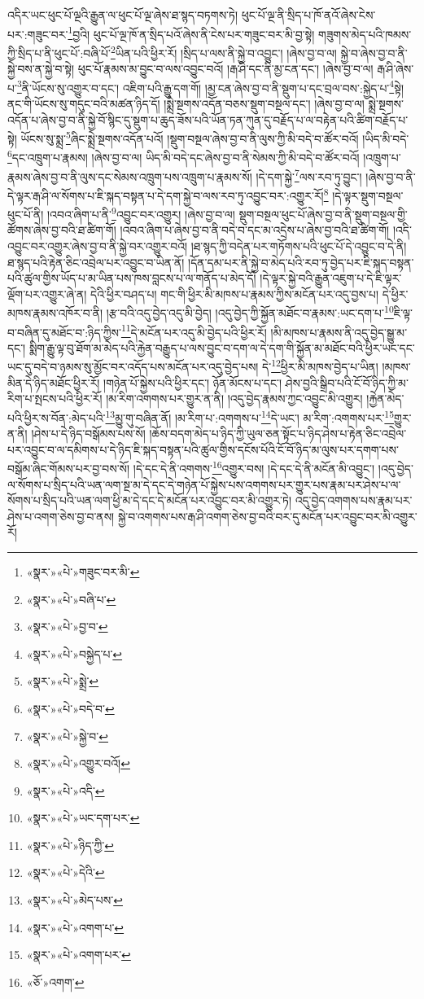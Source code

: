 འདིར་ཡང་ཕུང་པོ་ལྔའི་རྒྱུན་ལ་ཕུང་པོ་ལྔ་ཞེས་ཐ་སྙད་བཏགས་ཏེ། ཕུང་པོ་ལྔ་ནི་སྲིད་པ་ཁོ་ནའོ་ཞེས་ངེས་པར་:གཟུང་བར་\footnote{«སྣར་»«པེ་»གཟུང་བར་མི་}བྱའི། ཕུང་པོ་ལྔ་ཁོ་ན་སྲིད་པའོ་ཞེས་ནི་ངེས་པར་གཟུང་བར་མི་བྱ་སྟེ། གཟུགས་མེད་པའི་ཁམས་ཀྱི་སྲིད་པ་ནི་ཕུང་པོ་:བཞི་པོ་\footnote{«སྣར་»«པེ་»བཞི་པ་}ཡིན་པའི་ཕྱིར་རོ། །སྲིད་པ་ལས་ནི་སྐྱེ་བ་འབྱུང་། །ཞེས་བྱ་བ་ལ། སྐྱེ་བ་ཞེས་བྱ་བ་ནི་སྐྱེ་བས་ན་སྐྱེ་བ་སྟེ། ཕུང་པོ་རྣམས་མ་བྱུང་བ་ལས་འབྱུང་བའོ། །རྒ་ཤི་དང་ནི་མྱ་ངན་དང་། །ཞེས་བྱ་བ་ལ། རྒ་ཤི་ཞེས་པ་\footnote{«སྣར་»«པེ་»བྱ་བ་}ནི་ཡོངས་སུ་འགྱུར་བ་དང་། འཇིག་པའི་རྒྱུ་དག་གོ། །མྱ་ངན་ཞེས་བྱ་བ་ནི་སྡུག་པ་དང་བྲལ་བས་:སྐྱེད་པ་\footnote{«སྣར་»«པེ་»བསྐྱེད་པ་}སྟེ། ནང་གི་ཡོངས་སུ་གདུང་བའི་མཚན་ཉིད་དོ། །སྨྲེ་སྔགས་འདོན་བཅས་སྡུག་བསྔལ་དང་། །ཞེས་བྱ་བ་ལ། སྨྲེ་སྔགས་འདོན་པ་ཞེས་བྱ་བ་ནི་སྐྱེ་བོ་སྙིང་དུ་སྡུག་པ་ཆུད་ཟོས་པའི་ཡོན་ཏན་ཀུན་དུ་བརྗོད་པ་ལ་བརྟེན་པའི་ཚིག་བརྗོད་པ་སྟེ། ཡོངས་སུ་སྨྲ་\footnote{«སྣར་»«པེ་»སྨྲེ་}ཞིང་སྨྲེ་སྔགས་འདོན་པའོ། །སྡུག་བསྔལ་ཞེས་བྱ་བ་ནི་ལུས་ཀྱི་མི་བདེ་བ་ཚོར་བའོ། །ཡིད་མི་བདེ་\footnote{«སྣར་»«པེ་»བདེ་བ་}དང་འཁྲུག་པ་རྣམས། །ཞེས་བྱ་བ་ལ། ཡིད་མི་བདེ་དང་ཞེས་བྱ་བ་ནི་སེམས་ཀྱི་མི་བདེ་བ་ཚོར་བའོ། །འཁྲུག་པ་རྣམས་ཞེས་བྱ་བ་ནི་ལུས་དང་སེམས་འཁྲུག་པས་འཁྲུག་པ་རྣམས་སོ། །དེ་དག་སྐྱེ་\footnote{«སྣར་»«པེ་»སྐྱེ་བ་}ལས་རབ་ཏུ་བྱུང་། །ཞེས་བྱ་བ་ནི་དེ་ལྟར་རྒ་ཤི་ལ་སོགས་པ་ཇི་སྐད་བསྟན་པ་དེ་དག་སྐྱེ་བ་ལས་རབ་ཏུ་འབྱུང་བར་:འགྱུར་རོ།\footnote{«སྣར་»«པེ་»འགྱུར་བའོ།} །དེ་ལྟར་སྡུག་བསྔལ་ཕུང་པོ་ནི། །འབའ་ཞིག་པ་ནི་\footnote{«སྣར་»«པེ་»འདི་}འབྱུང་བར་འགྱུར། །ཞེས་བྱ་བ་ལ། སྡུག་བསྔལ་ཕུང་པོ་ཞེས་བྱ་བ་ནི་སྡུག་བསྔལ་གྱི་ཚོགས་ཞེས་བྱ་བའི་ཐ་ཚིག་གོ། །འབའ་ཞིག་པ་ཞེས་བྱ་བ་ནི་བདེ་བ་དང་མ་འདྲེས་པ་ཞེས་བྱ་བའི་ཐ་ཚིག་གོ། །འདི་འབྱུང་བར་འགྱུར་ཞེས་བྱ་བ་ནི་སྐྱེ་བར་འགྱུར་བའོ། །ཐ་སྙད་ཀྱི་བདེན་པར་གཏོགས་པའི་ཕུང་པོ་དེ་འབྱུང་བ་དེ་ནི། ཐ་སྙད་པའི་རྟེན་ཅིང་འབྲེལ་པར་འབྱུང་བ་ཡིན་ནོ། །དོན་དམ་པར་ནི་སྐྱེ་བ་མེད་པའི་རབ་ཏུ་བྱེད་པར་ཇི་སྐད་བསྟན་པའི་ཚུལ་གྱིས་ཡོད་པ་མ་ཡིན་པས་ཁས་བླངས་པ་ལ་གནོད་པ་མེད་དོ། །དེ་ལྟར་སྐྱེ་བའི་རྒྱུན་འཇུག་པ་དེ་ཇི་ལྟར་ལྡོག་པར་འགྱུར་ཞེ་ན། དེའི་ཕྱིར་བཤད་པ། གང་གི་ཕྱིར་མི་མཁས་པ་རྣམས་ཀྱིས་མངོན་པར་འདུ་བྱས་པ། དེ་ཕྱིར་མཁས་རྣམས་འཁོར་བ་ནི། །རྩ་བའི་འདུ་བྱེད་འདུ་མི་བྱེད། །འདུ་བྱེད་ཀྱི་སྐྱོན་མཐོང་བ་རྣམས་:ཡང་དག་པ་\footnote{«སྣར་»«པེ་»ཡང་དག་པར་}ཇི་ལྟ་བ་བཞིན་དུ་མཐོང་བ་:ཉིད་ཀྱིས་\footnote{«སྣར་»«པེ་»ཉིད་ཀྱི་}དེ་མངོན་པར་འདུ་མི་བྱེད་པའི་ཕྱིར་རོ། །མི་མཁས་པ་རྣམས་ནི་འདུ་བྱེད་སྒྱུ་མ་དང་། སྨིག་རྒྱུ་ལྟ་བུ་ཐོག་མ་མེད་པའི་རྐྱེན་བརྒྱུད་པ་ལས་བྱུང་བ་དག་ལ་དེ་དག་གི་སྐྱོན་མ་མཐོང་བའི་ཕྱིར་ཡང་དང་ཡང་དུ་བདེ་བ་ཉམས་སུ་མྱོང་བར་འདོད་པས་མངོན་པར་འདུ་བྱེད་པས། དེ་\footnote{«སྣར་»«པེ་»དེའི་}ཕྱིར་མི་མཁས་བྱེད་པ་ཡིན། །མཁས་མིན་དེ་ཉིད་མཐོང་ཕྱིར་རོ། །གཉེན་པོ་སྐྱེས་པའི་ཕྱིར་དང་། ཉོན་མོངས་པ་དང་། ཤེས་བྱའི་སྒྲིབ་པའི་ངོ་བོ་ཉིད་ཀྱི་མ་རིག་པ་སྤངས་པའི་ཕྱིར་རོ། །མ་རིག་འགགས་པར་གྱུར་ན་ནི། །འདུ་བྱེད་རྣམས་ཀྱང་འབྱུང་མི་འགྱུར། །རྐྱེན་མེད་པའི་ཕྱིར་ས་བོན་:མེད་པའི་\footnote{«སྣར་»«པེ་»མེད་པས་}མྱུ་གུ་བཞིན་ནོ། །མ་རིག་པ་:འགགས་པ་\footnote{«སྣར་»«པེ་»འགག་པ་}དེ་ཡང་། མ་རིག་:འགགས་པར་\footnote{«སྣར་»«པེ་»འགག་པར་}གྱུར་ན་ནི། །ཤེས་པ་དེ་ཉིད་བསྒོམས་པས་སོ། །ཆོས་བདག་མེད་པ་ཉིད་ཀྱི་ཡུལ་ཅན་སྟོང་པ་ཉིད་ཤེས་པ་རྟེན་ཅིང་འབྲེལ་པར་འབྱུང་བ་ལ་དམིགས་པ་དེ་ཉིད་ཇི་སྐད་བསྟན་པའི་ཚུལ་གྱིས་དངོས་པོའི་ངོ་བོ་ཉིད་མ་ལུས་པར་དགག་པས་བསྒོམ་ཞིང་གོམས་པར་བྱ་བས་སོ། །དེ་དང་དེ་ནི་འགགས་\footnote{«ཅོ་»འགག་}འགྱུར་བས། །དེ་དང་དེ་ནི་མངོན་མི་འབྱུང་། །འདུ་བྱེད་ལ་སོགས་པ་སྲིད་པའི་ཡན་ལག་སྔ་མ་དེ་དང་དེ་གཉེན་པོ་སྐྱེས་པས་འགགས་པར་གྱུར་པས་རྣམ་པར་ཤེས་པ་ལ་སོགས་པ་སྲིད་པའི་ཡན་ལག་ཕྱི་མ་དེ་དང་དེ་མངོན་པར་འབྱུང་བར་མི་འགྱུར་ཏེ། འདུ་བྱེད་འགགས་པས་རྣམ་པར་ཤེས་པ་འགག་ཅེས་བྱ་བ་ནས། སྐྱེ་བ་འགགས་པས་རྒ་ཤི་འགག་ཅེས་བྱ་བའི་བར་དུ་མངོན་པར་འབྱུང་བར་མི་འགྱུར་རོ། 